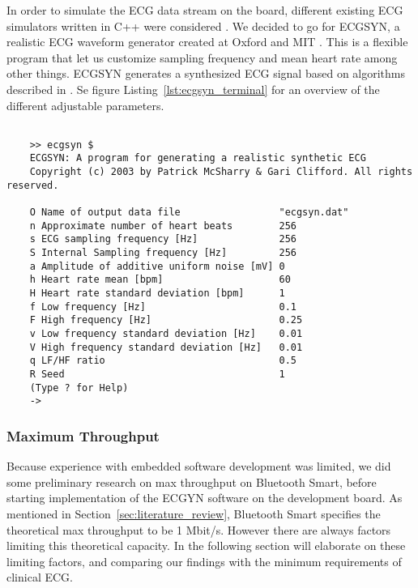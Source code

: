In order to simulate the ECG data stream on the board, different existing ECG simulators written in C++ were considered \cite{newRef_56, newRef_56_1, newRef_56_2}. We decided to go for ECGSYN, a realistic ECG waveform generator created at Oxford and MIT \cite{newRef_56_2}. This is a flexible program that let us customize sampling frequency and mean heart rate among other things. ECGSYN generates a synthesized ECG signal based on algorithms described in \cite{newRef_58}. Se figure Listing~\ref{lst:ecgsyn_terminal} for an overview of the different adjustable parameters.

\begin{lstlisting}[caption={ECGSYN Commando Line Interface (CLI)}, label={lst:ecgsyn_terminal}, basicstyle=\tiny]

    >> ecgsyn $
    ECGSYN: A program for generating a realistic synthetic ECG
    Copyright (c) 2003 by Patrick McSharry & Gari Clifford. All rights reserved.
     
    O Name of output data file                 "ecgsyn.dat"
    n Approximate number of heart beats        256
    s ECG sampling frequency [Hz]              256
    S Internal Sampling frequency [Hz]         256
    a Amplitude of additive uniform noise [mV] 0
    h Heart rate mean [bpm]                    60
    H Heart rate standard deviation [bpm]      1
    f Low frequency [Hz]                       0.1
    F High frequency [Hz]                      0.25
    v Low frequency standard deviation [Hz]    0.01
    V High frequency standard deviation [Hz]   0.01
    q LF/HF ratio                              0.5
    R Seed                                     1
    (Type ? for Help)
    ->

\end{lstlisting}

\subsubsection{Maximum Throughput} %
\label{ssub:maximum_throughput}

Because experience with embedded software development was limited, we did some preliminary research on max throughput on Bluetooth Smart, before starting implementation of the ECGYN software on the development board. As mentioned in Section~\ref{sec:literature_review}, Bluetooth Smart specifies the theoretical max throughput to be 1 Mbit/s. However there are always factors limiting this theoretical capacity. In the following section will elaborate on these limiting factors, and comparing our findings with the minimum requirements of clinical ECG.

